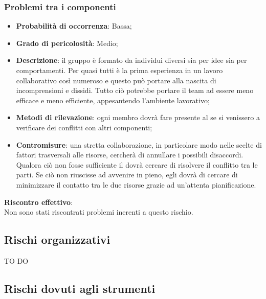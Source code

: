 		\subsubsection{Problemi tra i componenti} %
		\label{ssub:problemi_tra_i_componenti}
			\begin{itemize}
				\item \textbf{Probabilità di occorrenza}: Bassa;
				\item \textbf{Grado di pericolosità}: Medio;
				\item \textbf{Descrizione}: il gruppo è formato da individui diversi sia per idee sia per comportamenti. Per quasi tutti è la prima esperienza in un lavoro collaborativo così numeroso e questo può portare alla nascita di incomprensioni e dissidi. Tutto ciò potrebbe portare il team ad essere meno efficace e meno efficiente, appesantendo l'ambiente lavorativo;
				\item \textbf{Metodi di rilevazione}: ogni membro dovrà fare presente al \roleProjectManager{} se si venissero a verificare dei conflitti con altri componenti;
				\item \textbf{Contromisure}: una stretta collaborazione, in particolare modo nelle scelte di fattori trasversali alle risorse, cercherà di annullare i possibili disaccordi. \\
				Qualora ciò non fosse sufficiente il \roleProjectManager{} dovrà cercare di risolvere il conflitto tra le parti. Se ciò non riuscisse ad avvenire in pieno, egli dovrà di cercare di minimizzare il contatto tra le due risorse grazie ad un'attenta pianificazione. \\
			\end{itemize}
		\noindent
		\textbf{Riscontro effettivo}: \\
		Non sono stati riscontrati problemi inerenti a questo rischio.
		
	
	\subsection{Rischi organizzativi} %
	\label{sub:rischi_organizzativi}
	TO DO
	
	
	
	\subsection{Rischi dovuti agli strumenti} %
	\label{sub:rischi_dovuti_agli_strumenti}
